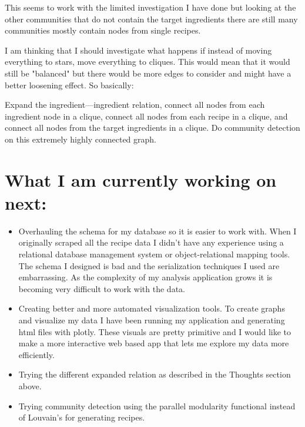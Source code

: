 \documentclass[conference]{IEEEtran}
\begin{document}
This seems to work with the limited investigation I have done but looking at the other
communities that do not contain the target ingredients there are still many communities mostly
contain nodes from single recipes.

I am thinking that I should investigate what happens if instead of moving everything to stars,
move everything to cliques. This would mean that it would still be "balanced" but there would
be more edges to consider and might have a better loosening effect. So basically:

Expand the ingredient---ingredient relation, connect all nodes from each ingredient node in a
clique, connect all nodes from each recipe in a clique, and connect all nodes from the target
ingredients in a clique. Do community detection on this extremely highly connected graph.

\section{What I am currently working on next:}
\begin{itemize}
   \item Overhauling the schema for my database so it is easier to work with. When I originally
      scraped all the recipe data I didn't have any experience using a relational database 
      management system or object-relational mapping tools. The schema I designed is bad and
      the serialization techniques I used are embarrassing. As the complexity of my analysis
      application grows it is becoming very difficult to work with the data.
   \item Creating better and more automated visualization tools. To create graphs and visualize
      my data I have been running my application and generating html files with plotly. These
      visuals are pretty primitive and I would like to make a more interactive web based app
      that lets me explore my data more efficiently.
   \item Trying the different expanded relation as described in the Thoughts section above.
   \item Trying community detection using the parallel modularity functional instead of Louvain's
      for generating recipes.
\end{itemize}


\end{document}
